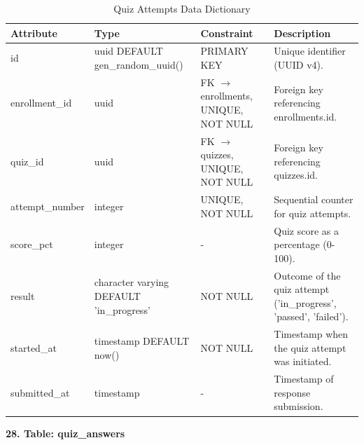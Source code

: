 \documentclass[12pt, oneside]{article} %
\newcommand{\tabbreak}{\hyphenpenalty=200\exhyphenpenalty=200\tolerance=4000\hbadness=10000\hspace{0pt}}
\begin{document}
\begin{table}[H]
\caption{Quiz Attempts Data Dictionary}
\label{tab:dd_quiz_attempts}
\vspace{-4mm}
\begin{center}
\renewcommand{\arraystretch}{1.15}
\scriptsize
\begin{tabular}{|>{\raggedright\arraybackslash\tabbreak}p{2.67cm}|>{\raggedright\arraybackslash\tabbreak}p{2.93cm}|>{\raggedright\arraybackslash\tabbreak}p{2.67cm}|>{\raggedright\arraybackslash\tabbreak}p{4.51cm}|}
\hline
\textbf{Attribute} & \textbf{Type} & \textbf{Constraint} & \textbf{Description} \\ \hline
id & uuid DEFAULT gen\_random\_uuid() & PRIMARY KEY & Unique identifier (UUID v4). \\ \hline
enrollment\_id & uuid & FK $\rightarrow$ enrollments, UNIQUE, NOT NULL & Foreign key referencing enrollments.id. \\ \hline
quiz\_id & uuid & FK $\rightarrow$ quizzes, UNIQUE, NOT NULL & Foreign key referencing quizzes.id. \\ \hline
attempt\_number & integer & UNIQUE, NOT NULL & Sequential counter for quiz attempts. \\ \hline
score\_pct & integer & - & Quiz score as a percentage (0-100). \\ \hline
result & character varying DEFAULT 'in\_progress' & NOT NULL & Outcome of the quiz attempt ('in\_progress', 'passed', 'failed'). \\ \hline
started\_at & timestamp DEFAULT now() & NOT NULL & Timestamp when the quiz attempt was initiated. \\ \hline
submitted\_at & timestamp & - & Timestamp of response submission. \\ \hline
\end{tabular}
\end{center}
\end{table}

\textbf{28. Table: quiz\_answers}
\end{document}
